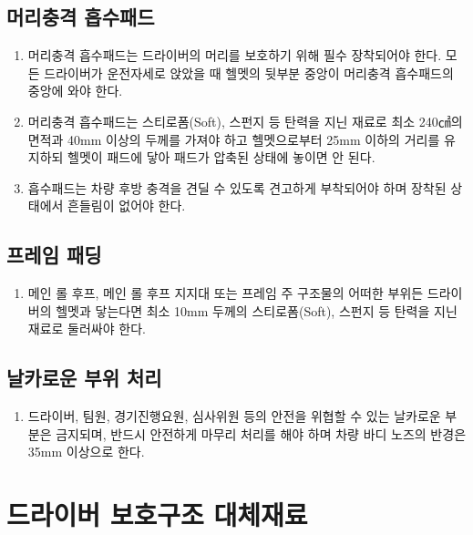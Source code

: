 \documentclass[final,a4paper,10pt]{report}
\begin{document}
\section{머리충격 흡수패드}
\begin{enumerate}
  \item 머리충격 흡수패드는 드라이버의 머리를 보호하기 위해 필수 장착되어야 한다. 모든 드라이버가 운전자세로 앉았을 때 헬멧의 뒷부분 중앙이 머리충격 흡수패드의 중앙에 와야 한다.
  \item 머리충격 흡수패드는 스티로폼(Soft), 스펀지 등 탄력을 지닌 재료로 최소 240㎠의 면적과 40mm 이상의 두께를 가져야 하고 헬멧으로부터 25mm 이하의 거리를 유지하되 헬멧이 패드에 닿아 패드가 압축된 상태에 놓이면 안 된다.
  \item 흡수패드는 차량 후방 충격을 견딜 수 있도록 견고하게 부착되어야 하며 장착된 상태에서 흔들림이 없어야 한다.
\end{enumerate}

\section{프레임 패딩}
\begin{enumerate}
  \item 메인 롤 후프, 메인 롤 후프 지지대 또는 프레임 주 구조물의 어떠한 부위든 드라이버의 헬멧과 닿는다면 최소 10mm 두께의 스티로폼(Soft), 스펀지 등 탄력을 지닌 재료로 둘러싸야 한다.
\end{enumerate}

\section{날카로운 부위 처리}
\begin{enumerate}
  \item 드라이버, 팀원, 경기진행요원, 심사위원 등의 안전을 위협할 수 있는 날카로운 부분은 금지되며, 반드시 안전하게 마무리 처리를 해야 하며 차량 바디 노즈의 반경은 35mm 이상으로 한다.
\end{enumerate}

\chapter{드라이버 보호구조 대체재료} \label{chapter:드라이버 보호구조 대체재료}
\end{document}
